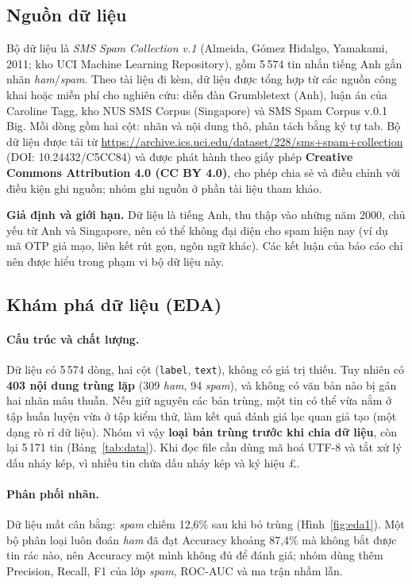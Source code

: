 \documentclass[12pt,a4paper]{article}
\newcommand{\spam}{\textit{spam}}
\newcommand{\ham}{\textit{ham}}
\begin{document}
\subsection{Nguồn dữ liệu}
Bộ dữ liệu là \textit{SMS Spam Collection v.1} (Almeida, Gómez Hidalgo, Yamakami, 2011; kho UCI Machine Learning Repository), gồm 5\,574 tin nhắn tiếng Anh gắn nhãn \ham/\spam. Theo tài liệu đi kèm, dữ liệu được tổng hợp từ các nguồn công khai hoặc miễn phí cho nghiên cứu: diễn đàn Grumbletext (Anh), luận án của Caroline Tagg, kho NUS SMS Corpus (Singapore) và SMS Spam Corpus v.0.1 Big. Mỗi dòng gồm hai cột: nhãn và nội dung thô, phân tách bằng ký tự tab. Bộ dữ liệu được tải từ \url{https://archive.ics.uci.edu/dataset/228/sms+spam+collection} (DOI: 10.24432/C5CC84) và được phát hành theo giấy phép \textbf{Creative Commons Attribution 4.0 (CC BY 4.0)}, cho phép chia sẻ và điều chỉnh với điều kiện ghi nguồn; nhóm ghi nguồn ở phần tài liệu tham khảo.

\textbf{Giả định và giới hạn.} Dữ liệu là tiếng Anh, thu thập vào những năm 2000, chủ yếu từ Anh và Singapore, nên có thể không đại diện cho spam hiện nay (ví dụ mã OTP giả mạo, liên kết rút gọn, ngôn ngữ khác). Các kết luận của báo cáo chỉ nên được hiểu trong phạm vi bộ dữ liệu này.

\subsection{Khám phá dữ liệu (EDA)}
\paragraph{Cấu trúc và chất lượng.} Dữ liệu có 5\,574 dòng, hai cột (\texttt{label}, \texttt{text}), không có giá trị thiếu. Tuy nhiên có \textbf{403 nội dung trùng lặp} (309 \ham, 94 \spam), và không có văn bản nào bị gán hai nhãn mâu thuẫn. Nếu giữ nguyên các bản trùng, một tin có thể vừa nằm ở tập huấn luyện vừa ở tập kiểm thử, làm kết quả đánh giá lạc quan giả tạo (một dạng rò rỉ dữ liệu). Nhóm vì vậy \textbf{loại bản trùng trước khi chia dữ liệu}, còn lại 5\,171 tin (Bảng~\ref{tab:data}). Khi đọc file cần dùng mã hoá UTF-8 và tắt xử lý dấu nháy kép, vì nhiều tin chứa dấu nháy kép và ký hiệu £.

\TabData

\paragraph{Phân phối nhãn.} Dữ liệu mất cân bằng: \spam{} chiếm 12,6\% sau khi bỏ trùng (Hình~\ref{fig:eda1}). Một bộ phân loại luôn đoán \ham{} đã đạt Accuracy khoảng 87,4\% mà không bắt được tin rác nào, nên Accuracy một mình không đủ để đánh giá; nhóm dùng thêm Precision, Recall, F1 của lớp \spam, ROC-AUC và ma trận nhầm lẫn.
\end{document}
